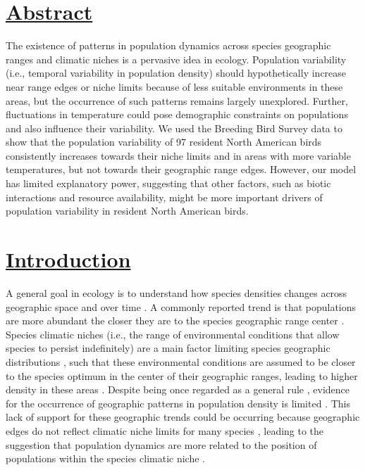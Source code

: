 
\section*{\textbf{\underline{Abstract}}}
The existence of patterns in population dynamics across species geographic ranges and climatic niches is a pervasive idea in ecology. Population variability (i.e., temporal variability in population density) should hypothetically increase near range edges or niche limits because of less suitable environments in these areas, but the occurrence of such patterns remains largely unexplored. Further, fluctuations in temperature could pose demographic constraints on populations and also influence their variability. We used the Breeding Bird Survey data to show that the population variability of 97 resident North American birds consistently increases towards their niche limits and in areas with more variable temperatures, but not towards their geographic range edges. However, our model has limited explanatory power, suggesting that other factors, such as biotic interactions and resource availability, might be more important drivers of population variability in resident North American birds.
\section*{\textbf{\underline{Introduction}}}
A general goal in ecology is to understand how species densities changes across geographic space and over time \parencite{lundberg2000,borregaard2010}. A commonly reported trend is that populations are more abundant the closer they are to the species geographic range center \parencite{brown1984, sexton2009}. Species climatic niches (i.e., the range of environmental conditions that allow species to persist indefinitely) are a main factor limiting species geographic distributions \parencite{pulliam2000, colwell2009}, such that these environmental conditions are assumed to be closer to the species optimum in the center of their geographic ranges, leading to higher density in these areas \parencite{brown1984,sagarin2006, pironon2017}. Despite being once regarded as a general rule \parencite{hengeveld1982}, evidence for the occurrence of geographic patterns in population density is limited \parencite{sagarin2002, sagarin2006, pironon2017, dallas2017}. This lack of support for these geographic trends could be occurring because geographic edges do not reflect climatic niche limits for many species \parencite{oldfather2019, pennington2021}, leading to the suggestion that population dynamics are more related to the position of populations within the species climatic niche \parencite{martinez2013,osorio2020}.  

